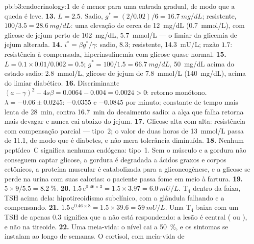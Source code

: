 \begin{solution}{pb:b3:endocrinology:1}
de  é menor para uma entrada gradual, de modo que a queda é
leve.
\textbf{13.} $L = 2.5$. Sadio, $g^{*} = (2/0.02)/6 = \qty{16.7}{mg/dL}$;
resistente, $100/3.5 = \qty{28.6}{mg/dL}$: uma elevação de cerca de
\qty{12}{mg/dL} (\qty{0.7}{mmol/L}), com glicose de jejum perto de
\qty{102}{mg/dL}, \qty{5.7}{mmol/L} --- o limiar da glicemia de jejum
alterada.
\textbf{14.} $i^{*} = \beta g^{*}/\gamma$: sadio, $8.3$; resistente,
\qty{14.3}{mU/L}; razão $1.7$: resistência à  compensada,
hiperinsulinemia com glicose quase normal.
\textbf{15.} $L = 0.1\times 0.01/0.002 = 0.5$; $g^{*} = 100/1.5 =
\qty{66.7}{mg/dL}$, \qty{50}{mg/dL} acima do estado sadio:
\qty{2.8}{mmol/L}, glicose de jejum de \qty{7.8}{mmol/L}
(\qty{140}{mg/dL}), acima do limiar diabético.
\textbf{16.} Discriminante $(a - \gamma)^{2} - 4s\beta = 0.0064 - 0.004 =
0.0024 > 0$: retorno monótono. $\lambda = -0.06 \pm 0.0245$: $-0.0355$ e
$-0.0845$ por minuto; constante de tempo mais lenta de \qty{28}{min},
contra \qty{16.7}{min} do decaimento sadio: a alça que falha retorna
mais devagar e nunca cai abaixo do jejum.
\textbf{17.} Glicose alta com  alta: resistência com compensação
parcial --- tipo~2; o valor de duas horas de \qty{13}{mmol/L} passa de
\qty{11.1}{}, de modo que é diabetes, e não mera tolerância diminuída.
\textbf{18.} Nenhum peptídeo~C significa nenhuma  endógena:
tipo~1. Sem  o músculo e a gordura não conseguem captar glicose,
a gordura é degradada a ácidos graxos e corpos cetônicos, a proteína
muscular é catabolizada para a gliconeogênese, e a glicose se perde na
urina com suas calorias: o paciente passa fome em meio à fartura.
\textbf{19.} $5\times 9/5.5 = \qty{8.2}{\%}$.
\textbf{20.} $1.5\,\mathrm{e}^{0.46\times 3} = 1.5\times 3.97 =
\qty{6.0}{mU/L}$. T$_{4}$ dentro da faixa, TSH acima dela:
hipotireoidismo subclínico, com a glândula falhando e a 
compensando.
\textbf{21.} $1.5\,\mathrm{e}^{0.46\times 8} = 1.5\times 39.6 =
\qty{59}{mU/L}$. Uma T$_{4}$ baixa com um TSH de apenas $0.3$ significa
que a  não está respondendo: a lesão é central ( ou
), e não na tireoide.
\textbf{22.} Uma meia-vida: o nível cai a \qty{50}{\%}, e os sintomas se
instalam ao longo de semanas. O cortisol, com meia-vida de

\end{solution}
